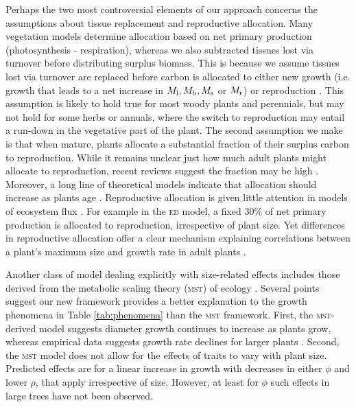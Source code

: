 \documentclass[9pt,twocolumn,twoside,lineno]{pnas-new}
\begin{document}
Perhaps the two most controversial elements of our approach concerns the assumptions about tissue replacement and reproductive allocation. Many vegetation models determine allocation based on net primary production (photosynthesis - respiration), whereas we also subtracted tissues lost via turnover before distributing surplus biomass. This is because we assume tissues lost via turnover are replaced before carbon is allocated to either new growth (i.e. growth that leads to a net increase in $M_{\rm l}, M_{\rm b}, M_{\rm s}$ or $M_{\rm r}$) or reproduction \citep{Thornley-2000}. This assumption is likely to hold true for most woody plants and perennials, but may not hold for some herbs or annuals, where the switch to reproduction may entail a run-down in the vegetative part of the plant. The second assumption we make is that when mature, plants allocate a substantial fraction of their surplus carbon to reproduction. While it remains unclear just how much adult plants might allocate to reproduction, recent reviews suggest the fraction may be high \citep{Thomas-2011, Wenk-2015}. Moreover, a long line of theoretical models indicate that allocation should increase as plants age \citep[reviewed by ][]{Wenk-2015}. Reproductive allocation is given little attention in models of ecosystem flux \citep[e.g.][]{Sitch-2008, DeKauwe-2014}. For example in the \textsc{ed} model, a fixed 30\% of net primary production is allocated to reproduction, irrespective of plant size. Yet differences in reproductive allocation offer a clear mechanism explaining correlations between a plant's maximum size and growth rate in adult plants \citep[e.g.][]{Wright-2010}.

Another class of model dealing explicitly with size-related effects includes those derived from the metabolic scaling theory (\textsc{mst}) of ecology \citep{Enquist-1999, Enquist-2007}. Several points suggest our new framework provides a better explanation to the growth phenomena in Table \ref{tab:phenomena} than the \textsc{mst} framework. First, the \textsc{mst}-derived model suggests diameter growth continues to increase as plants grow, whereas empirical data suggests growth rate declines for larger plants \citep{Canham-2004, Canham-2006, Herault-2011}. Second, the \textsc{mst} model does not allow for the effects of traits to vary with plant size. Predicted effects are for a linear increase in growth with decreases in either $\phi$ and lower $\rho$, that apply irrespective of size. However, at least for $\phi$ such effects in large trees have not been observed.
\end{document}
